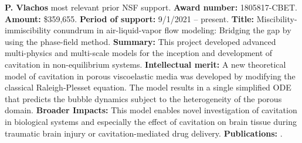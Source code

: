 \textbf{P. Vlachos} most relevant prior NSF support. \textbf{Award number:} 1805817-CBET. \textbf{Amount: }\$359,655. \textbf{Period of support:} 9/1/2021 -- present. \textbf{Title:} Miscibility-immiscibility conundrum in air-liquid-vapor flow modeling: Bridging the gap by using the phase-field method. \textbf{Summary:} This project developed advanced multi-physics and multi-scale models for the inception and development of cavitation in non-equilibrium systems. \textbf{Intellectual merit:} A new theoretical model of cavitation in porous viscoelastic media was developed by modifying the classical Raleigh-Plesset equation. The model results in a single simplified ODE that predicts the bubble dynamics subject to the heterogeneity of the porous domain. \textbf{Broader Impacts:} This model enables novel investigation of cavitation in biological systems and especially the effect of cavitation on brain tissue during traumatic brain injury or cavitation-mediated drug delivery. \textbf{Publications:} \cite{10.1063/1.5109889, HU2022114526, 10.1063/5.0021697, 10.1093/pnasnexus/pgac150}.



